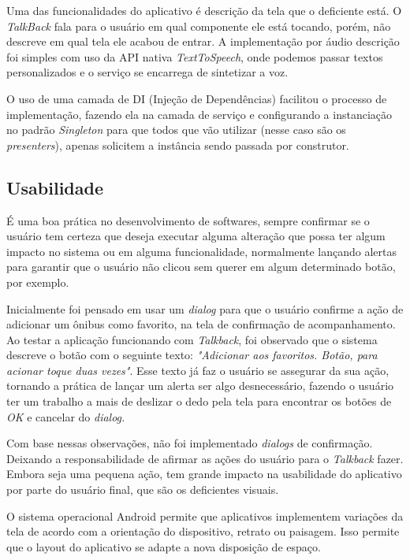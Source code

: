 \documentclass[
	12pt,				%
	oneside,			%
	a4paper,			%
	brazil				%
]{abntex2}
\begin{document}
Uma das funcionalidades do aplicativo é descrição da tela que o deficiente está. O \textit{TalkBack} fala para o usuário em qual componente ele está tocando, porém, não descreve em qual tela ele acabou de entrar. 
A implementação por áudio descrição foi simples com uso da API nativa \textit{TextToSpeech}, onde podemos passar textos personalizados e o serviço se encarrega de sintetizar a voz.

O uso de uma camada de DI (Injeção de Dependências) facilitou o processo de implementação, fazendo ela na camada de serviço e configurando a instanciação no padrão \textit{Singleton} para que todos que vão utilizar (nesse caso são os \textit{presenters}), apenas solicitem a instância sendo passada por construtor.

\subsection{Usabilidade}

É uma boa prática no desenvolvimento de softwares, sempre confirmar se o usuário tem certeza que deseja executar alguma alteração que possa ter algum impacto no sistema ou em alguma funcionalidade, normalmente lançando alertas para garantir que o usuário não clicou sem querer em algum determinado botão, por exemplo. 

Inicialmente foi pensado em usar um \textit{dialog} para que o usuário confirme a ação de adicionar um ônibus como favorito, na tela de confirmação de acompanhamento. Ao testar a aplicação funcionando com \textit{Talkback}, foi observado que o sistema descreve o botão com o seguinte texto: \textit{"Adicionar aos favoritos. Botão, para acionar toque duas vezes"}. Esse texto já faz o usuário se assegurar da sua ação, tornando a prática de lançar um alerta ser algo desnecessário, fazendo o usuário ter um trabalho a mais de deslizar o dedo pela tela para encontrar os botões de \textit{OK} e cancelar do \textit{dialog.}

Com base nessas observações, não foi implementado \textit{dialogs} de confirmação. Deixando a responsabilidade de afirmar as ações do usuário para o \textit{Talkback} fazer. Embora seja uma pequena ação, tem grande impacto na usabilidade do aplicativo por parte do usuário final, que são os deficientes visuais.

O sistema operacional Android permite que aplicativos implementem variações da tela de acordo com a orientação do dispositivo, retrato ou paisagem. Isso permite que o layout do aplicativo se adapte a nova disposição de espaço.
\end{document}
